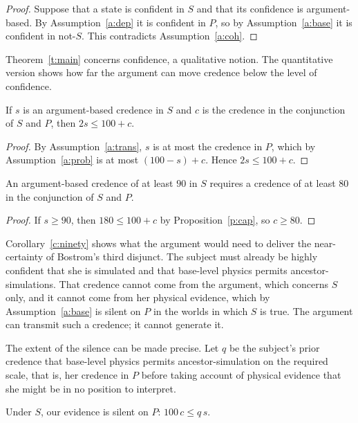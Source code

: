 \documentclass{situationist-preprint}
\begin{document}
\begin{proof}
Suppose that a state is confident in $S$ and that its confidence is argument-based. By Assumption~\ref{a:dep} it is confident in $P$, so by Assumption~\ref{a:base} it is confident in not-$S$. This contradicts Assumption~\ref{a:coh}.
\end{proof}

Theorem~\ref{t:main} concerns confidence, a qualitative notion. The quantitative version shows how far the argument can move credence below the level of confidence.

\begin{proposition}\label{p:cap}
If $s$ is an argument-based credence in $S$ and $c$ is the credence in the conjunction of $S$ and $P$, then $2s \le 100 + c$.
\end{proposition}

\begin{proof}
By Assumption~\ref{a:trans}, $s$ is at most the credence in $P$, which by Assumption~\ref{a:prob} is at most $(100 - s) + c$. Hence $2s \le 100 + c$.
\end{proof}

\begin{corollary}\label{c:ninety}
An argument-based credence of at least $90$ in $S$ requires a credence of at least $80$ in the conjunction of $S$ and $P$.
\end{corollary}

\begin{proof}
If $s \ge 90$, then $180 \le 100 + c$ by Proposition~\ref{p:cap}, so $c \ge 80$.
\end{proof}

Corollary~\ref{c:ninety} shows what the argument would need to deliver the near-certainty of Bostrom's third disjunct. The subject must already be highly confident that she is simulated and that base-level physics permits ancestor-simulations. That credence cannot come from the argument, which concerns $S$ only, and it cannot come from her physical evidence, which by Assumption~\ref{a:base} is silent on $P$ in the worlds in which $S$ is true. The argument can transmit such a credence; it cannot generate it.

The extent of the silence can be made precise. Let $q$ be the subject's prior credence that base-level physics permits ancestor-simulation on the required scale, that is, her credence in $P$ before taking account of physical evidence that she might be in no position to interpret.

\begin{assumption}[Silence]\label{a:silence}
Under $S$, our evidence is silent on $P$: $100\,c \le q\,s$.
\end{assumption}
\end{document}
